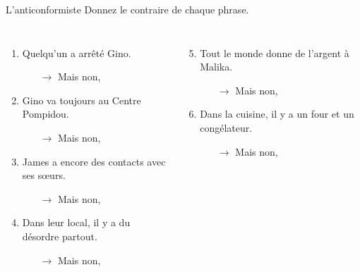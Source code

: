 \begin{frame}{L'anticonformiste}
  \footnotesize
  Donnez le contraire de chaque phrase.
  \begin{columns}[t]
      \begin{enumerate}
        \item \alert{Quelqu'un} a arrêté Gino.
        \begin{itemize}
          \scriptsize
          \item[$\to$] Mais non, 
        \end{itemize}
        \item Gino va \alert{toujours} au Centre Pompidou.
        \begin{itemize}
          \scriptsize
          \item[$\to$] Mais non, 
        \end{itemize}
        \item James a \alert{encore} des contacts avec ses sœurs.
        \begin{itemize}
          \scriptsize
          \item[$\to$] Mais non, 
        \end{itemize}
        \item Dans leur local, il y a du désordre \alert{partout}.
        \begin{itemize}
          \scriptsize
          \item[$\to$] Mais non, 
        \end{itemize}
      \end{enumerate}
      \begin{enumerate}
        \setcounter{enumi}{4}
        \item \alert{Tout le monde} donne de l'argent à Malika.
        \begin{itemize}
          \scriptsize
          \item[$\to$] Mais non, 
        \end{itemize}
        \item Dans la cuisine, il y a \alert{un four et un congélateur}.
        \begin{itemize}
          \scriptsize
          \item[$\to$] Mais non, 

\end{itemize}
\end{enumerate}
\end{columns}
\end{frame}
